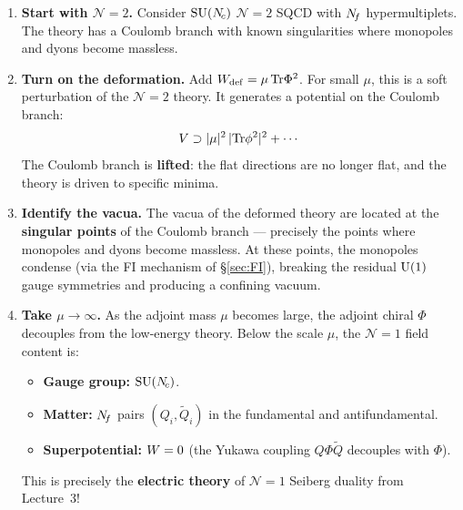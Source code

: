 \documentclass[11pt,a4paper]{article}
\begin{document}
\begin{tcolorbox}[
  enhanced,
  colback=green!5!white,
  colframe=green!60!black,
  fonttitle=\bfseries,
  title={The APS Deformation Argument}
]
\begin{enumerate}[label=\textbf{Step \arabic*.},leftmargin=*]
  \item \textbf{Start with $\mathcal{N}=2$.}  Consider $\mathrm{SU}(N_{\!c})$
    $\mathcal{N}=2$ SQCD with $N_{\!f}$ hypermultiplets.  The theory has a
    Coulomb branch with known singularities where monopoles and dyons
    become massless.

  \item \textbf{Turn on the deformation.}  Add
    $W_{\mathrm{def}} = \mu\,\mathrm{Tr}\Phi^2$.  For small $\mu$, this is
    a soft perturbation of the $\mathcal{N}=2$ theory.  It generates a
    potential on the Coulomb branch:
    \[
      V \supset |\mu|^2\,|\mathrm{Tr}\phi^2|^2 + \cdots
    \]
    The Coulomb branch is \textbf{lifted}: the flat directions are no
    longer flat, and the theory is driven to specific minima.

  \item \textbf{Identify the vacua.}  The vacua of the deformed theory
    are located at the \textbf{singular points} of the Coulomb branch
    --- precisely the points where monopoles and dyons become massless.
    At these points, the monopoles condense (via the FI mechanism of
    \S\ref{sec:FI}), breaking the residual $\mathrm{U}(1)$ gauge symmetries
    and producing a confining vacuum.

  \item \textbf{Take $\mu \to \infty$.}  As the adjoint mass $\mu$
    becomes large, the adjoint chiral $\Phi$ decouples from the
    low-energy theory.  Below the scale $\mu$, the $\mathcal{N}=1$
    field content is:
    \begin{itemize}
      \item \textbf{Gauge group:} $\mathrm{SU}(N_{\!c})$.
      \item \textbf{Matter:} $N_{\!f}$ pairs $(Q_i, \widetilde{Q}_i)$ in the
        fundamental and antifundamental.
      \item \textbf{Superpotential:} $W = 0$ (the Yukawa coupling
        $Q\Phi\widetilde{Q}$ decouples with $\Phi$).
    \end{itemize}
    This is precisely the \textbf{electric theory} of $\mathcal{N}=1$
    Seiberg duality from Lecture~3!
\end{enumerate}
\end{tcolorbox}
\end{document}
